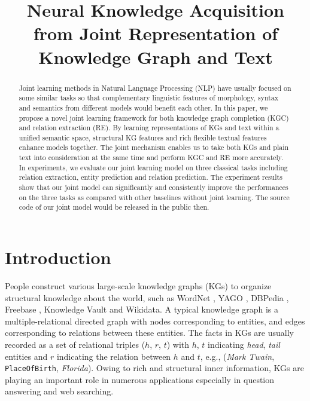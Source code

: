 \documentclass[11pt,a4paper]{article}
\title{Neural Knowledge Acquisition from Joint Representation of Knowledge Graph and Text}
\begin{document}
\maketitle

\begin{abstract}
  Joint learning methods in Natural Language Processing (NLP) have usually focused on some similar tasks so that complementary linguistic features of morphology, syntax and semantics from different models would benefit each other. In this paper, we propose a novel joint learning framework for both knowledge graph completion (KGC) and relation extraction (RE). By learning representations of KGs and text within a unified semantic space, structural KG features and rich flexible textual features enhance models together. The joint mechanism enables us to take both KGs and plain text into consideration at the same time and perform KGC and RE more accurately. In experiments, we evaluate our joint learning model on three classical tasks including relation extraction, entity prediction and relation prediction. The experiment results show that our joint model can significantly and consistently improve the performances on the three tasks as compared with other baselines without joint learning. The source code of our joint model would be released in the public then.
\end{abstract}


\section{Introduction}
\label{intro}

People construct various large-scale knowledge graphs (KGs) to organize structural knowledge about the world, such as WordNet \cite{miller1995wordnet}, YAGO \cite{suchanek2007yago}, DBPedia \cite{auer2007dbpedia}, Freebase \cite{bollacker2008freebase}, Knowledge Vault \cite{dong2014knowledge} and Wikidata\cite{vrandevcic2014wikidata}. A typical knowledge graph is a multiple-relational directed graph with nodes corresponding to entities, and edges corresponding to relations between these entities. The facts in KGs are usually recorded as a set of relational triples ($h$, $r$, $t$) with $h$, $t$ indicating \emph{head}, \emph{tail} entities and $r$ indicating the relation between $h$ and $t$, e.g., (\emph{Mark Twain}, \texttt{PlaceOfBirth}, \emph{Florida}). Owing to rich and structural inner information, KGs are playing an important role in numerous applications especially in question answering and web searching.
\end{document}
